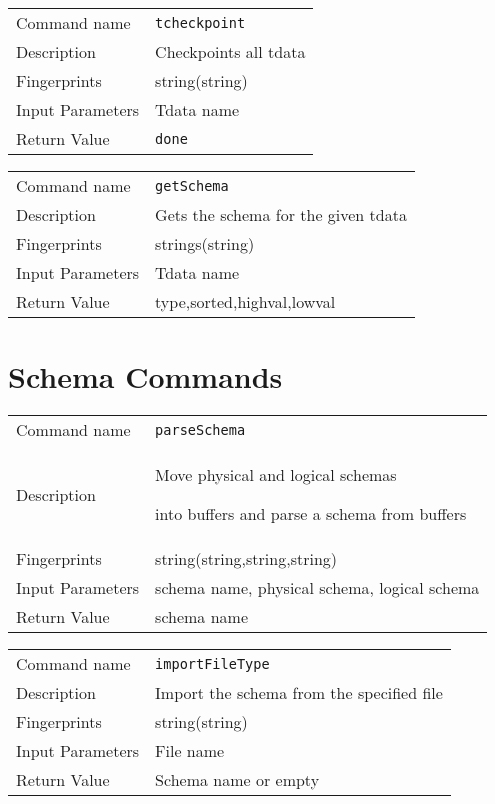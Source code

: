 \noindent
\begin{tabular}{l|p{5in}}
\hline
Command name &{\tt tcheckpoint }\\ 
Description &
 Checkpoints all tdata 
 	\\
Fingerprints & string(string)\\
Input Parameters& Tdata name \\
Return Value&{\tt done}\\
\hline
\end{tabular}
\bigskip

\noindent
\begin{tabular}{l|p{5in}}
\hline
Command name &{\tt getSchema }\\ 
Description &
 Gets the schema for the given tdata 
 	\\
Fingerprints & strings(string)\\
Input Parameters& Tdata name \\
Return Value&type,sorted,highval,lowval\\
\hline
\end{tabular}
\bigskip


\section{Schema Commands}
\noindent
\begin{tabular}{l|p{5in}}
\hline
Command name &{\tt parseSchema }\\ 
Description &
Move physical and logical schemas
 
into buffers and parse a schema from buffers
 	\\
Fingerprints & string(string,string,string)\\
Input Parameters&schema name, physical schema, logical schema\\
Return Value&schema name\\
\hline
\end{tabular}
\bigskip

\noindent
\begin{tabular}{l|p{5in}}
\hline
Command name &{\tt importFileType }\\ 
Description &
 Import the schema from the specified file 
 	\\
Fingerprints & string(string)\\
Input Parameters& File name \\
Return Value& Schema name or empty \\
\hline
\end{tabular}
\bigskip

